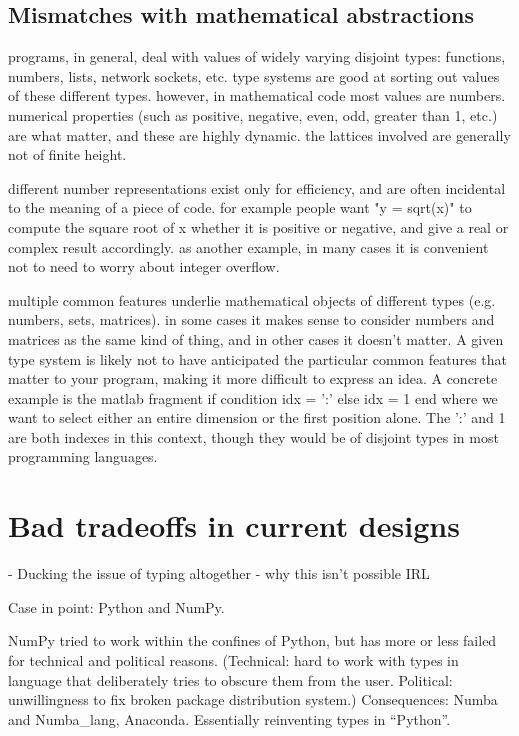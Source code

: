 \subsection{Mismatches with mathematical abstractions}

programs, in general, deal with values of widely varying disjoint types:
functions, numbers, lists, network sockets, etc. type systems
are good at sorting out values of these different types. however, in
mathematical code most values are numbers. numerical properties (such as
positive, negative, even, odd, greater than 1, etc.) are what matter,
and these are highly dynamic. the lattices involved are generally not of
finite height.

different number representations exist only for efficiency, and are often
incidental to the meaning of a piece of code. for example people want
"y = sqrt(x)" to compute the square root of x whether it is positive or
negative, and give a real or complex result accordingly. as another
example, in many cases it is convenient not to need to worry about
integer overflow.


multiple common features underlie mathematical objects of different
types (e.g. numbers, sets, matrices). in some cases it makes sense to
consider numbers and matrices as the same kind of thing, and in other
cases it doesn't matter. A given type system is likely not to have
anticipated the particular common features that matter to your program,
making it more difficult to express an idea. A concrete example is
the matlab fragment
if condition
  idx = ':'
else
  idx = 1
end
where we want to select either an entire dimension or the first position
alone. The ':' and 1 are both indexes in this context, though they would
be of disjoint types in most programming languages.



\section{Bad tradeoffs in current designs}


- Ducking the issue of typing altogether - why this isn't possible IRL

Case in point: Python and NumPy.

NumPy tried to work within the confines of Python, but has more or
less failed for technical and political reasons. (Technical: hard
to work with types in language that deliberately tries to obscure
them from the user. Political: unwillingness to fix broken package
distribution system.) Consequences: Numba and Numba\_lang, Anaconda.
Essentially reinventing types in ``Python''. 

